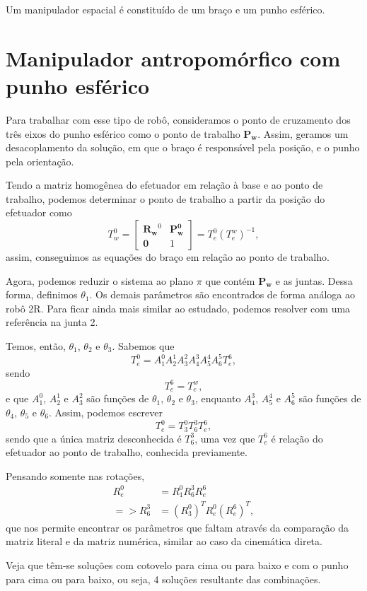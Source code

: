 
Um manipulador espacial é constituído de um braço e um punho esférico.

\section*{Manipulador antropomórfico com punho esférico}

Para trabalhar com esse tipo de robô, consideramos o ponto de cruzamento dos três eixos do punho esférico como o ponto de trabalho $\bm{P_w}$. Assim, geramos um desacoplamento da solução, em que o braço é responsável pela posição, e o punho pela orientação.

Tendo a matriz homogênea do efetuador em relação à base e ao ponto de trabalho, podemos determinar o ponto de trabalho a partir da posição do efetuador como \[
    T_w^{0} = \begin{bmatrix} \bm{R_w}^{0} & \bm{P_w^{0}} \\ \bm{0} & 1 \end{bmatrix} = T_e^{0}\left( T_e^{w} \right) ^{-1}
,\] assim, conseguimos as equações do braço em relação ao ponto de trabalho.

Agora, podemos reduzir o sistema ao plano $\pi$ que contém $\bm{P_w}$ e as juntas. Dessa forma, definimos $\theta_1$. Os demais parâmetros são encontrados de forma análoga ao robô 2R. Para ficar ainda mais similar ao estudado, podemos resolver com uma referência na junta 2.

Temos, então, $\theta_1$, $\theta_2$ e $\theta_3$. Sabemos que \[
T_e^{0} = A_1^{0}A_2^{1}A_3^2A_4^3A_5^4A_6^5T_e^6
,\] sendo \[
T_e^6 = T_e ^w
,\] e que $A_1^0$, $A_2^1$ e $A_3^2$ são funções de $\theta_1$, $\theta_2$ e $\theta_3$, enquanto $A_4^3$, $A_5^4$ e $A_6^5$ são funções de $\theta_4$, $\theta_5$ e $\theta_6$. Assim, podemos escrever \[
T_e^{0} = T_3^0T_6^3T_e^6
,\] sendo que a única matriz desconhecida é $T_6^3$, uma vez que $T_e^6$ é relação do efetuador ao ponto de trabalho, conhecida previamente.

Pensando somente nas rotações,
\begin{align*}
    R_e^0 &= R_1^0R_6^3R_e^6 \\
    => R_6^3 &= \left(R_3^0\right)^TR_e^0\left( R_e^6 \right)^T
,\end{align*}
que nos permite encontrar os parâmetros que faltam através da comparação da matriz literal e da matriz numérica, similar ao caso da cinemática direta.

Veja que têm-se soluções com cotovelo para cima ou para baixo e com o punho para cima ou para baixo, ou seja, 4 soluções resultante das combinações.


